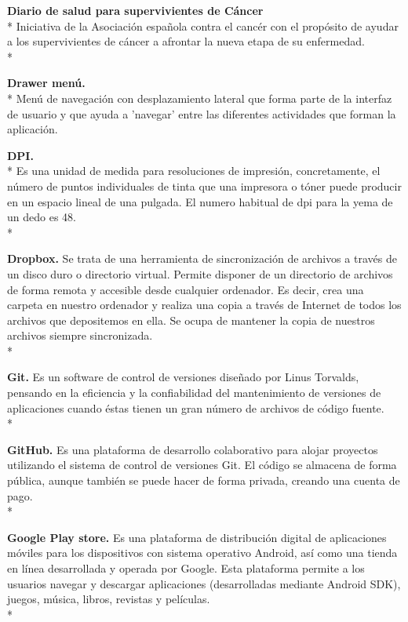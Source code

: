 \documentclass[../pfc.tex]{subfiles}
\begin{document}
	\textbf{Diario de salud para supervivientes de Cáncer}\\*
	Iniciativa de la Asociación española contra el cancér con el propósito de ayudar a los supervivientes de cáncer a afrontar la nueva etapa de su enfermedad.\\*
	
	\textbf{Drawer menú.}\\*
	Menú de navegación con desplazamiento lateral que forma parte de la interfaz de usuario y que ayuda a 'navegar' entre las diferentes actividades que forman la aplicación.
	
	\textbf{DPI.}\\*
	Es una unidad de medida para resoluciones de impresión, concretamente, el número de puntos individuales de tinta que una impresora o tóner puede producir en un espacio lineal de una pulgada.
	El numero habitual de dpi para la yema de un dedo es 48.\\*
	
	\textbf{Dropbox.}
	Se trata de una herramienta de sincronización de archivos a través de un disco duro o
	directorio virtual. Permite disponer de un directorio de archivos de forma remota y accesible desde
	cualquier ordenador. Es decir, crea una carpeta en nuestro ordenador y realiza una copia a través
	de Internet de todos los archivos que depositemos en ella. Se ocupa de mantener la copia de
	nuestros archivos siempre sincronizada.\\*
	
	\textbf{Git.}
	Es un software de control de versiones diseñado por Linus Torvalds, pensando en la eficiencia y la confiabilidad del mantenimiento de versiones de aplicaciones cuando éstas tienen un gran número de archivos de código fuente. \\*
	
	\textbf{GitHub.}
	Es una plataforma de desarrollo colaborativo para alojar proyectos utilizando el sistema de control de versiones Git.
	El código se almacena de forma pública, aunque también se puede hacer de forma privada, creando una cuenta de pago.\\*
	
	\textbf{Google Play store.}
	Es una plataforma de distribución digital de aplicaciones móviles para los dispositivos con sistema operativo Android, así como una tienda en línea desarrollada y operada por Google. Esta plataforma permite a los usuarios navegar y descargar aplicaciones (desarrolladas mediante Android SDK), juegos, música, libros, revistas y películas.\\*
	
\end{document}

